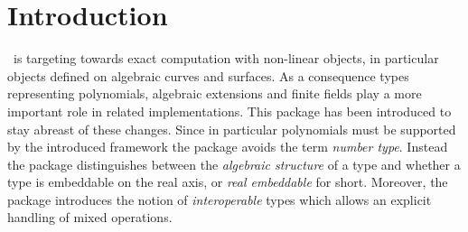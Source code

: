 
\section{Introduction}

\cgal ~is targeting towards exact computation with non-linear objects, 
in particular objects defined on algebraic curves and surfaces. 
As a consequence types representing polynomials, algebraic extensions and 
finite fields play a more important role in related implementations. 
This package has been introduced to stay abreast of these changes. 
Since in particular polynomials must be supported by the introduced framework
the package avoids the term {\em number type}. Instead the package distinguishes 
between the {\em algebraic structure} of a type and whether a type is embeddable on 
the real axis, or {\em real embeddable} for short. 
Moreover, the package introduces the notion of {\em interoperable} types which 
allows an explicit handling of mixed operations. 
 


